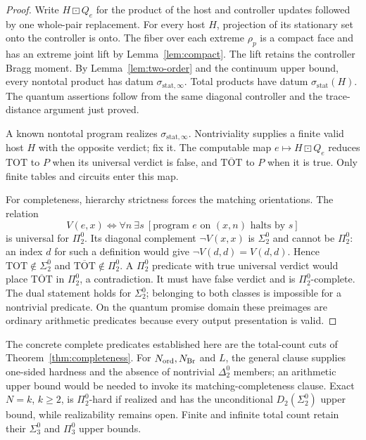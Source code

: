 \begin{proof}
Write \(H\boxdot Q_e\) for the product of the host and controller
updates followed by one whole-pair replacement.
For every host \(H\), projection of its stationary set onto
the controller is onto.
The fiber over each extreme \(\rho_p\) is a compact face and
has an extreme joint lift by Lemma~\ref{lem:compact}.
The lift retains the controller Bragg moment. By
Lemma~\ref{lem:two-order} and the continuum upper bound, every
nontotal product has datum \(\sigma_{\mathrm{stat},\infty}\).
Total products have datum \(\sigma_{\mathrm{stat}}(H)\).
The quantum assertions follow from the same diagonal controller
and the trace-distance argument just proved.

A known nontotal program realizes
\(\sigma_{\mathrm{stat},\infty}\). Nontriviality supplies a
finite valid host \(H\) with the opposite verdict; fix it.
The computable map \(e\mapsto H\boxdot Q_e\) reduces
\(\mathrm{TOT}\) to \(P\) when its universal verdict is false,
and \(\overline{\mathrm{TOT}}\) to \(P\) when it is true.
Only finite tables and circuits enter this map.

For completeness, hierarchy strictness forces the matching
orientations. The relation
\[
 V(e,x)\iff\forall n\ \exists s\
 [\text{program }e\text{ on }(x,n)\text{ halts by }s]
\]
is universal for \(\Pi^0_2\). Its diagonal complement
\(\neg V(x,x)\) is \(\Sigma^0_2\) and cannot be \(\Pi^0_2\):
an index \(d\) for such a definition would give
\(\neg V(d,d)=V(d,d)\). Hence \(\mathrm{TOT}\notin\Sigma^0_2\)
and \(\overline{\mathrm{TOT}}\notin\Pi^0_2\).
A \(\Pi^0_2\) predicate with true universal verdict would
place \(\overline{\mathrm{TOT}}\) in \(\Pi^0_2\), a contradiction.
It must have false verdict and is \(\Pi^0_2\)-complete.
The dual statement holds for \(\Sigma^0_2\); belonging to both
classes is impossible for a nontrivial predicate.
On the quantum promise domain these preimages are ordinary
arithmetic predicates because every output presentation is valid.
\end{proof}

The concrete complete predicates established here are the total-count
cuts of Theorem~\ref{thm:completeness}. For \(N_{\mathrm{ord}},N_{\mathrm{Br}}\)
and \(L\), the general clause supplies one-sided hardness and the
absence of nontrivial \(\Delta^0_2\) members; an arithmetic upper
bound would be needed to invoke its matching-completeness clause.
Exact \(N=k\), \(k\ge2\), is \(\Pi^0_2\)-hard if realized and
has the unconditional \(D_2(\Sigma^0_2)\) upper bound, while
realizability remains open. Finite and infinite total count retain
their \(\Sigma^0_3\) and \(\Pi^0_3\) upper bounds.
